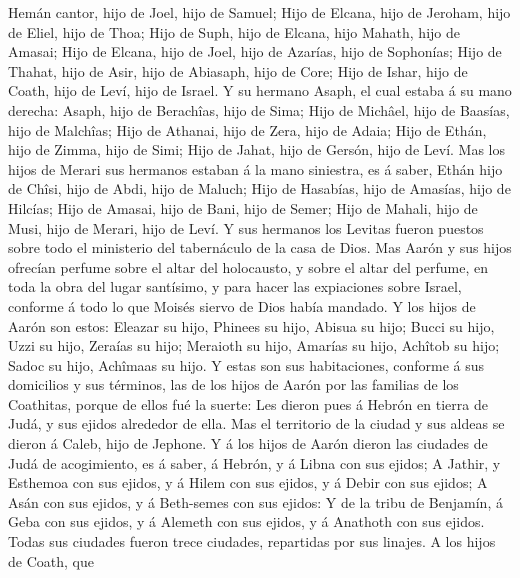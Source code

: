 Hemán cantor, hijo de Joel, hijo de Samuel;  Hijo de
Elcana, hijo de Jeroham, hijo de Eliel, hijo de Thoa;  Hijo
de Suph, hijo de Elcana, hijo Mahath, hijo de Amasai;  Hijo
de Elcana, hijo de Joel, hijo de Azarías, hijo de Sophonías;
 Hijo de Thahat, hijo de Asir, hijo de Abiasaph, hijo de
Core;  Hijo de Ishar, hijo de Coath, hijo de Leví, hijo de
Israel.  Y su hermano Asaph, el cual estaba á su mano
derecha: Asaph, hijo de Berachîas, hijo de Sima;  Hijo de
Michâel, hijo de Baasías, hijo de Malchîas;  Hijo de
Athanai, hijo de Zera, hijo de Adaia;  Hijo de Ethán, hijo
de Zimma, hijo de Simi;  Hijo de Jahat, hijo de Gersón,
hijo de Leví.  Mas los hijos de Merari sus hermanos estaban
á la mano siniestra, es á saber, Ethán hijo de Chîsi, hijo de Abdi, hijo
de Maluch;  Hijo de Hasabías, hijo de Amasías, hijo de
Hilcías;  Hijo de Amasai, hijo de Bani, hijo de Semer;
 Hijo de Mahali, hijo de Musi, hijo de Merari, hijo de
Leví.  Y sus hermanos los Levitas fueron puestos sobre todo
el ministerio del tabernáculo de la casa de Dios.  Mas
Aarón y sus hijos ofrecían perfume sobre el altar del holocausto, y
sobre el altar del perfume, en toda la obra del lugar santísimo, y para
hacer las expiaciones sobre Israel, conforme á todo lo que Moisés siervo
de Dios había mandado.  Y los hijos de Aarón son estos:
Eleazar su hijo, Phinees su hijo, Abisua su hijo;  Bucci su
hijo, Uzzi su hijo, Zeraías su hijo;  Meraioth su hijo,
Amarías su hijo, Achîtob su hijo;  Sadoc su hijo, Achîmaas
su hijo.  Y estas son sus habitaciones, conforme á sus
domicilios y sus términos, las de los hijos de Aarón por las familias de
los Coathitas, porque de ellos fué la suerte:  Les dieron
pues á Hebrón en tierra de Judá, y sus ejidos alrededor de ella.
 Mas el territorio de la ciudad y sus aldeas se dieron á
Caleb, hijo de Jephone.  Y á los hijos de Aarón dieron las
ciudades de Judá de acogimiento, es á saber, á Hebrón, y á Libna con sus
ejidos;  A Jathir, y Esthemoa con sus ejidos, y á Hilem con
sus ejidos, y á Debir con sus ejidos;  A Asán con sus
ejidos, y á Beth-semes con sus ejidos:  Y de la tribu de
Benjamín, á Geba con sus ejidos, y á Alemeth con sus ejidos, y á
Anathoth con sus ejidos. Todas sus ciudades fueron trece ciudades,
repartidas por sus linajes.  A los hijos de Coath, que
